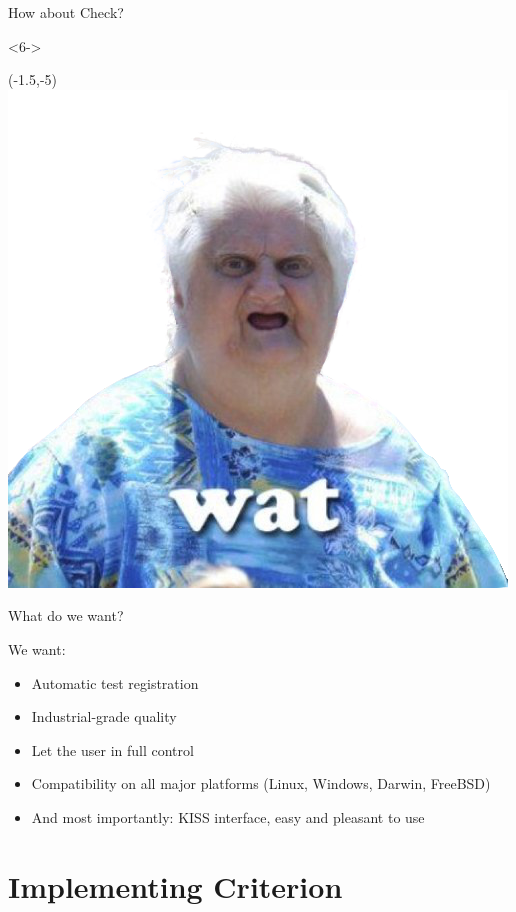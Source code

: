 \documentclass[10pt]{beamer}
\begin{document}
\begin{frame}[fragile]{How about Check?}
  \begin{onlyenv}<6->
  \begin{textblock}{1}(-1.5,-5)
    \includegraphics[angle=-90,totalheight=1.5cm]{wat.png}
  \end{textblock}
  \end{onlyenv}

\end{frame}


\begin{frame}[fragile]{What do we want?}

  We want:
  \begin{itemize}[<+-|alert@+>]
    \item Automatic test registration
    \item Industrial-grade quality
    \item Let the user in full control
    \item Compatibility on all major platforms (Linux, Windows, Darwin, FreeBSD)
    \item And most importantly: KISS interface, easy and pleasant to use
  \end{itemize}

\end{frame}

\section{Implementing Criterion}
\end{document}
